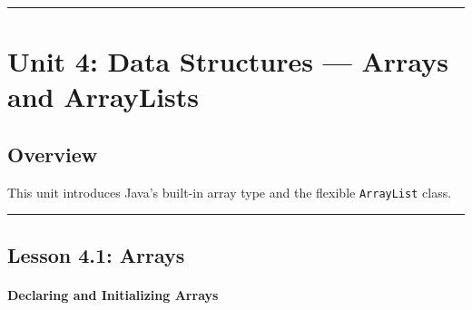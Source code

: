 \documentclass[
  justified,
  openright,
]{tufte-book}
\let\subsubsection\paragraph
\let\paragraph\paragraph
\let\subsubsection\paragraph
\let\paragraph\paragraph
\begin{document}
\begin{center}\rule{0.5\linewidth}{0.5pt}\end{center}

\section{Unit 4: Data Structures --- Arrays and
ArrayLists}\label{unit-4-data-structures-arrays-and-arraylists}

\subsection{Overview}\label{overview-4}

This unit introduces Java's built-in array type and the flexible
\texttt{ArrayList} class.

\begin{center}\rule{0.5\linewidth}{0.5pt}\end{center}

\subsection{Lesson 4.1: Arrays}\label{lesson-4.1-arrays-1}

\subsubsection{Declaring and Initializing
Arrays}\label{declaring-and-initializing-arrays}
\end{document}
